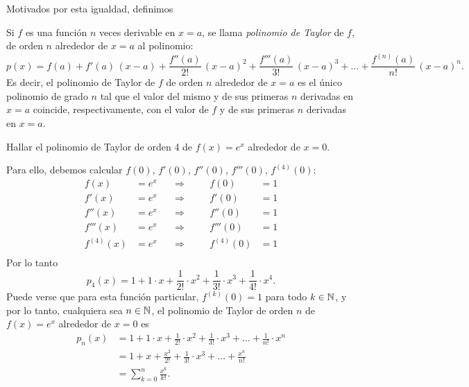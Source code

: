 
Motivados por esta igualdad, definimos

\begin{definition}
 Si $f$ es una función $n$ veces derivable en $x=a$, se llama \emph{polinomio de Taylor} de $f$, de orden $n$ alrededor de $x=a$ al polinomio:
\[
 p(x) = f(a) + f'(a) \, (x-a) + \frac{f''(a)}{2!}\, (x-a)^2 + \frac{f'''(a)}{3!}\, (x-a)^3 + \dots
 + \frac{f^{(n)}(a)}{n!} \, (x-a)^{n}.
\]
Es decir, el polinomio de Taylor de $f$ de orden $n$ alrededor de $x=a$ es el único polinomio de grado $n$ tal que el valor del mismo y de sus primeras $n$ derivadas en $x=a$ coincide, respectivamente, con el valor de $f$ y de sus primeras $n$ derivadas en $x=a$.
\end{definition}

\begin{example}
 Hallar el polinomio de Taylor de orden 4 de $f(x) = e^x$ alrededor de $x=0$.

 Para ello, debemos calcular $f(0)$, $f'(0)$, $f''(0)$, $f'''(0)$, $f^{(4)}(0)$:
\[
\begin{aligned}
 f(x) &= e^x  \quad &\Longrightarrow & &\quad f(0)  &= 1 \\
 f'(x) &= e^x \quad &\Longrightarrow& & \quad f'(0) &= 1 \\
 f''(x) &= e^x \quad &\Longrightarrow& & \quad f''(0) &= 1 \\
 f'''(x) &= e^x \quad &\Longrightarrow& & \quad f'''(0) &= 1 \\
 f^{(4)}(x) &= e^x \quad &\Longrightarrow& & \quad f^{(4)}(0) &= 1 \\
\end{aligned}
\]
Por lo tanto 
\[
 p_4(x) = 1 + 1 \cdot x + \frac{1}{2!} \cdot x^2 + \frac{1}{3!} \cdot x^3 +  \frac{1}{4!} \cdot x^4 .
\]
Puede verse que para esta función particular, $f^{(k)}(0) = 1$ para todo $k \in \mathbb{N}$, y por lo tanto, cualquiera sea $n\in\mathbb{N}$, el polinomio de Taylor de orden $n$ de $f(x) = e^x$ alrededor de $x=0$ es
\begin{align*}
 p_n(x) &= 1 + 1 \cdot x + \frac{1}{2!} \cdot x^2 + \frac{1}{3!} \cdot x^3 +\dots +  \frac{1}{n!} \cdot x^n \\
&= 1 +  x + \frac{x^2}{2!} + \frac{1}{3!} \cdot x^3 + \dots +  \frac{x^n}{n!}  \\
&= \sum_{k=0}^n \frac{x^k}{k!}.
\end{align*}
\end{example}

